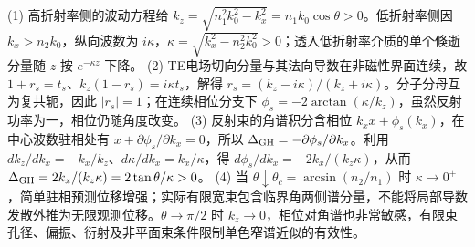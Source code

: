 (1) 高折射率侧的波动方程给 \(k_z=\sqrt{n_1^2k_0^2-k_x^2}=n_1k_0\cos\theta>0\)。低折射率侧因 \(k_x>n_2k_0\)，纵向波数为 \(i\kappa\)，\(\kappa=\sqrt{k_x^2-n_2^2k_0^2}>0\)；透入低折射率介质的单个倏逝分量随 \(z\) 按 \(e^{-\kappa z}\) 下降。
(2) TE电场切向分量与其法向导数在非磁性界面连续，故 \(1+r_s=t_s\)、\(k_z(1-r_s)=i\kappa t_s\)，解得 \(r_s=(k_z-i\kappa)/(k_z+i\kappa)\)。分子分母互为复共轭，因此 \(|r_s|=1\)；在连续相位分支下 \(\phi_s=-2\arctan(\kappa/k_z)\)，虽然反射功率为一，相位仍随角度改变。
(3) 反射束的角谱积分含相位 \(k_xx+\phi_s(k_x)\)，在中心波数驻相处有 \(x+\partial\phi_s/\partial k_x=0\)，所以 \(\Delta_{\rm GH}=-\partial\phi_s/\partial k_x\)。利用 \(dk_z/dk_x=-k_x/k_z\)、\(d\kappa/dk_x=k_x/\kappa\)，得 \(d\phi_s/dk_x=-2k_x/(k_z\kappa)\)，从而 \(\Delta_{\rm GH}=2k_x/(k_z\kappa)=2\tan\theta/\kappa>0\)。
(4) 当 \(\theta\downarrow\theta_c=\arcsin(n_2/n_1)\) 时 \(\kappa\to0^+\)，简单驻相预测位移增强；实际有限宽束包含临界角两侧谱分量，不能将局部导数发散外推为无限观测位移。\(\theta\to\pi/2\) 时 \(k_z\to0\)，相位对角谱也非常敏感，有限束孔径、偏振、衍射及非平面束条件限制单色窄谱近似的有效性。
